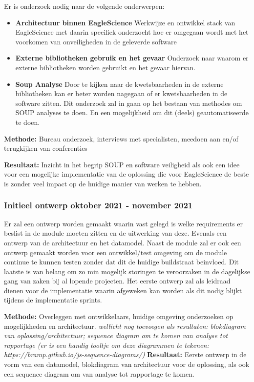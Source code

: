 Er is onderzoek nodig naar de volgende onderwerpen:
    \begin{itemize}
        \item \textbf{Architectuur binnen EagleScience} Werkwijze en ontwikkel stack van EagleScience met daarin specifiek onderzocht hoe er omgegaan wordt met het voorkomen van onveiligheden in de geleverde software
        \item \textbf{Externe bibliotheken gebruik en het gevaar} Onderzoek naar waarom er externe bibliotheken worden gebruikt en het gevaar hiervan.
        \item \textbf{Soup Analyse} Door te kijken naar de kwetsbaarheden in de externe bibliotheken kan er beter worden nagegaan of er kwetsbaarheden in de software zitten. Dit onderzoek zal in gaan op het bestaan van methodes om SOUP analyses te doen. En een mogelijkheid om dit (deels) geautomatiseerde te doen.
    \end{itemize}

    \textbf{Methode:} Bureau onderzoek, interviews met specialisten, meedoen aan en/of terugkijken van conferenties

    \textbf{Resultaat:} Inzicht in het begrip SOUP en software veiligheid als ook een idee voor een mogelijke implementatie van de oplossing die voor EagleScience de beste is zonder veel impact op de huidige manier van werken te hebben.

    \subsubsection{Initieel ontwerp \textbf{oktober 2021 - november 2021 }}\label{sec:initieel-ontwerp}
    Er zal een ontwerp worden gemaakt waarin vast gelegd is welke requirements er beslist in de module moeten zitten en de uitwerking van deze. Evenals een ontwerp van de architectuur en het datamodel. Naast de module zal er ook een ontwerp gemaakt worden voor een ontwikkel/test omgeving om de module continue te kunnen testen zonder dat dit de huidige buildstraat beinvloed. Dit laatste is van belang om zo min mogelijk storingen te veroorzaken in de dagelijkse gang van zaken bij al lopende projecten. Het eerste ontwerp zal als leidraad dienen voor de implementatie waarin afgeweken kan worden als dit nodig blijkt tijdens de implementatie sprints.

    \textbf{Methode:} Overleggen met ontwikkelaars, huidige omgeving onderzoeken op mogelijkheden en architectuur.
    \textit{wellicht nog toevoegen als resultaten: blokdiagram van oplossing/architectuur; sequence diagram om te komen van analyse tot rapportage (er is een handig tooltje om deze diagrammen te tekenen: https://bramp.github.io/js-sequence-diagrams/)}
    \textbf{Resultaat:} Eerste ontwerp in de vorm van een datamodel, blokdiagram van architectuur voor de oplossing, als ook een sequence diagram om van analyse tot rapportage te komen.


